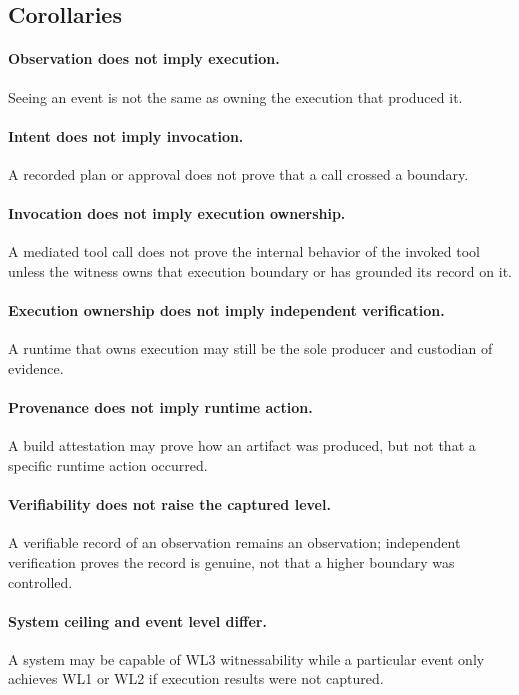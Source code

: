 \documentclass[11pt]{article}
\begin{document}
\subsection{Corollaries}

\paragraph{Observation does not imply execution.} Seeing an event is not the same as owning the execution that produced it.

\paragraph{Intent does not imply invocation.} A recorded plan or approval does not prove that a call crossed a boundary.

\paragraph{Invocation does not imply execution ownership.} A mediated tool call does not prove the internal behavior of the invoked tool unless the witness owns that execution boundary or has grounded its record on it.

\paragraph{Execution ownership does not imply independent verification.} A runtime that owns execution may still be the sole producer and custodian of evidence.

\paragraph{Provenance does not imply runtime action.} A build attestation may prove how an artifact was produced, but not that a specific runtime action occurred.

\paragraph{Verifiability does not raise the captured level.} A verifiable record of an observation remains an observation; independent verification proves the record is genuine, not that a higher boundary was controlled.

\paragraph{System ceiling and event level differ.} A system may be capable of WL3 witnessability while a particular event only achieves WL1 or WL2 if execution results were not captured.
\end{document}
